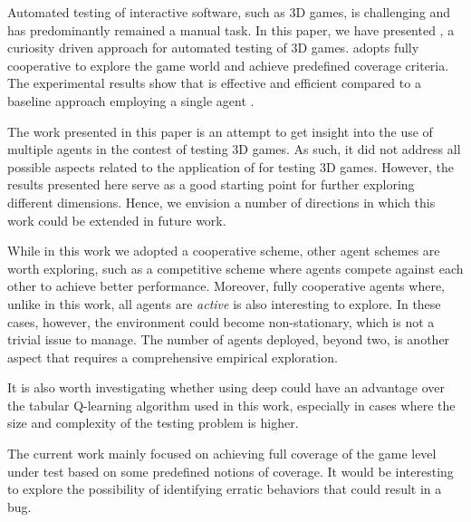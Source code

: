 Automated testing of interactive software, such as 3D games, is challenging and has predominantly remained a manual task. In this paper, we have presented \approach, a curiosity driven \marlacronym approach for automated testing of 3D games. \approach adopts fully cooperative \marlacronym to explore the game world and achieve predefined coverage criteria. The experimental results show that \approach is effective and efficient compared to a baseline approach employing a single agent \rlacronym.

The work presented in this paper is an attempt to get insight into the use of multiple agents in the contest of testing 3D games. As such, it did not address all possible aspects related to the application of \marlacronym for testing 3D games. However, the results presented here serve as a good starting point for further exploring different dimensions. Hence, we envision a number of directions in which this work could be extended in future work. 

While in this work we adopted a cooperative \marlacronym scheme, other  agent schemes are worth exploring, such as a competitive scheme where agents compete against each other to achieve better performance. Moreover, fully cooperative agents where, unlike in this work, all agents are \emph{active} is also interesting to explore. In these cases, however, the environment could become non-stationary, which is not a trivial issue to manage. The number of agents deployed, beyond two, is another aspect that requires a comprehensive empirical exploration.

It is also worth investigating whether using deep \rlacronym could have an advantage over the tabular Q-learning algorithm used in this work, especially in cases where the size and complexity of the testing problem is higher. 

The current work mainly focused on achieving full coverage of the game level under test based on some predefined notions of coverage. It would be interesting to explore the possibility of identifying erratic behaviors that could result in a bug.

